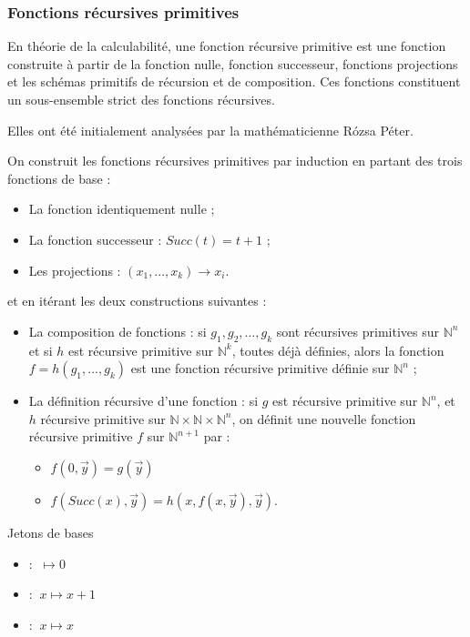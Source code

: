 		\subsubsection{Fonctions récursives primitives}

\begin{definition}
En théorie de la calculabilité, une fonction récursive primitive est une fonction construite à partir de la fonction nulle, fonction successeur, fonctions projections et les schémas primitifs de récursion et de composition. Ces fonctions constituent un sous-ensemble strict des fonctions récursives.
\par Elles ont été initialement analysées par la mathématicienne Rózsa Péter.
\par On construit les fonctions récursives primitives par induction en partant des trois fonctions de base :
\begin{itemize}
	\item La fonction identiquement nulle ;
	\item La fonction successeur : $Succ(t)=t+1$ ;
	\item Les projections : $(x_{1},...,x_{k})\rightarrow x_{i}$.
\end{itemize}
et en itérant les deux constructions suivantes :
\begin{itemize}
	\item La composition de fonctions : 
si $g_{1}, g_{2}, ..., g_{k}$ sont récursives primitives sur $\mathbb {N} ^{n}$ 
et si $h$ est récursive primitive sur $\mathbb {N} ^{k}$, toutes déjà définies,
alors la fonction $f=h(g_{1},...,g_{k})$ est une fonction récursive primitive définie sur $\mathbb {N} ^{n}$ ;

	\item La définition récursive d'une fonction : 
si $g$ est récursive primitive sur $\mathbb {N} ^{n}$, et $h$ récursive primitive sur ${\mathbb  N}\times {\mathbb  N}\times {\mathbb  N}^{n}$, on définit une nouvelle fonction récursive primitive $f$ sur ${\mathbb  N}^{{n+1}}$ par :
	\begin{itemize}
		\item $f(0,\vec y) = g(\vec y)$
		\item $ f(Succ(x),\vec y) = h(x,f(x,\vec y),\vec y)$.
	\end{itemize}
\end{itemize}
\end{definition}

\begin{definition}{Jetons de bases}
\begin{itemize}
\item \Zero : $~ \mapsto 0$
\item \Successor : $~x \mapsto x+1$
\item \Identity : $~x \mapsto x$
\end{itemize}
\end{definition}

